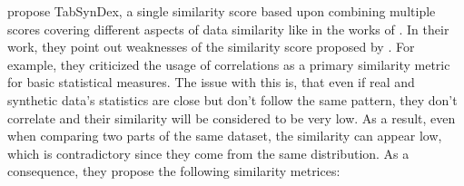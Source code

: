 \textcite{chundawat2022UniversalMetricRobust} propose TabSynDex, a single similarity score based upon combining multiple scores covering different aspects of data similarity like in the works of \cite{brenninkmeijer2019GenerationEvaluationTabular}.
In their work, they point out weaknesses of the similarity score proposed by \textcite{brenninkmeijer2019GenerationEvaluationTabular}.
For example, they criticized the usage of correlations as a primary similarity metric for basic statistical measures.
The issue with this is, that even if real and synthetic data's statistics are close but don't follow the same pattern, they don't correlate and their similarity will be considered to be very low.
As a result, even when comparing two parts of the same dataset, the similarity can appear low, which is contradictory since they come from the same distribution.
As a consequence, they propose the following similarity metrices:

